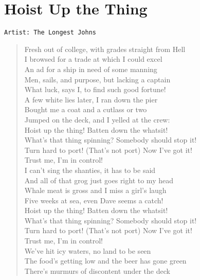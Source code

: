 \documentclass[11pt]{article}
\begin{document}
\section{Hoist Up the Thing}
\label{sec:org709b0ec}
\begin{verbatim}
Artist: The Longest Johns
\end{verbatim}
\begin{verse}
Fresh out of college, with grades straight from Hell\\
I browsed for a trade at which I could excel\\
An ad for a ship in need of some manning\\
Men, sails, and purpose, but lacking a captain\\
\vspace*{1em}
What luck, says I, to find such good fortune!\\
A few white lies later, I ran down the pier\\
Bought me a coat and a cutlass or two\\
Jumped on the deck, and I yelled at the crew:\\
\vspace*{1em}
Hoist up the thing! Batten down the whatsit!\\
What's that thing spinning? Somebody should stop it!\\
Turn hard to port! (That's not port) Now I've got it!\\
Trust me, I'm in control!\\
\vspace*{1em}
I can't sing the shanties, it has to be said\\
And all of that grog just goes right to my head\\
Whale meat is gross and I miss a girl's laugh\\
Five weeks at sea, even Dave seems a catch!\\
\vspace*{1em}
Hoist up the thing! Batten down the whatsit!\\
What's that thing spinning? Somebody should stop it!\\
Turn hard to port! (That's not port) Now I've got it!\\
Trust me, I'm in control!\\
\vspace*{1em}
We've hit icy waters, no land to be seen\\
The food's getting low and the beer has gone green\\
There's murmurs of discontent under the deck\\

\end{verse}
\end{document}
